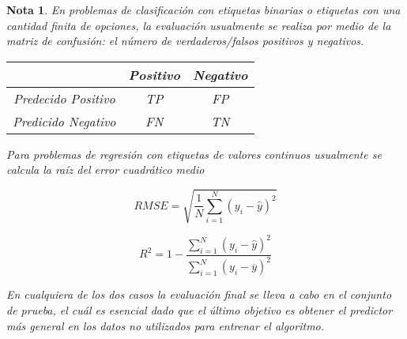 \documentclass[12pt]{article}
\newtheorem{Note}{Nota}%
\begin{document}
\begin{Note}

En problemas de clasificación con etiquetas binarias o etiquetas con una cantidad finita de opciones, la evaluación usualmente se realiza por medio de la matriz de confusión: el número de verdaderos/falsos positivos y negativos.

\begin{center}
\begin{tabular}{|c|c|c|}\hline
& Positivo & Negativo\\\hline
Predecido Positivo& TP & FP\\\hline
Predicido Negativo& FN & TN\\\hline
\end{tabular}
\end{center}

Para problemas de regresión con etiquetas de valores continuos usualmente se calcula la raíz del error cuadrático medio

\begin{equation}
RMSE=\sqrt{\frac{1}{N}\sum_{i=1}^{N}\left(y_{i}-\hat{y}\right)^2}
\end{equation}


\begin{equation}
R^2=1-\frac{\sum_{i=1}^{N}\left(y_{i}-\hat{y}\right)^2}{\sum_{i=1}^{N}\left(y_{i}-\overline{y}\right)^2}
\end{equation}


En cualquiera de los dos casos la evaluación final se lleva a cabo en el conjunto de prueba, el cuál es esencial dado que el último objetivo es obtener el predictor más general en los datos no utilizados para entrenar el algoritmo.
\end{Note}
\end{document}
